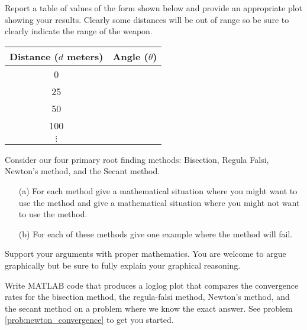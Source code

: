 \begin{problem}
\begin{enumerate}
            Report a table of values of the form shown below and provide an appropriate
            plot showing your results.  Clearly some distances will be out of range so be
            sure to clearly indicate the range of the weapon.
            \begin{center}
                \begin{tabular}{|c|c|}
                    \hline
                    Distance ($d$ meters) & Angle ($\theta$) \\ \hline \hline
                    0 & \\
                    25 & \\
                    50 & \\
                    100 & \\
                    $\vdots$ & \\ \hline
                \end{tabular}
            \end{center}
    \end{enumerate}
\end{problem}


\begin{problem}
    Consider our four primary root finding methods: Bisection, Regula Falsi, Newton's method, and the
    Secant method.  
    \begin{enumerate}
        \item[(a)] For each method give a mathematical situation where you might want to
            use the method and give a mathematical situation where you might not want to
            use the method.  
        \item[(b)] For each of these methods give one example where the method will fail.  
        \end{enumerate}
        Support your arguments with proper mathematics.  You are welcome to argue
        graphically but be sure to fully explain your graphical reasoning.
\end{problem}


\begin{problem}
    Write MATLAB code that produces a loglog plot that compares the convergence rates for
    the bisection method, the regula-falsi method, Newton's method, and the secant method
    on a problem where we know the exact answer. See problem \ref{prob:newton_convergence}
    to get you started.
\end{problem}



